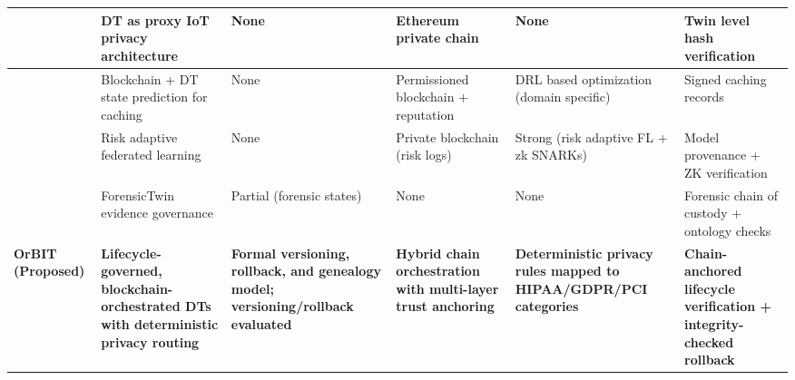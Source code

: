 \documentclass[final,5p,times,twocolumn]{elsarticle}
\begin{document}
\begin{table}[!htbp]
{\begin{tabular}{p{1.3cm}p{4cm}p{3.2cm}p{3.2cm}p{3.5cm}p{3.2cm}}
\cite{samaniego2023digital}      & DT as proxy IoT privacy architecture                                                  & None                                                                & Ethereum private chain                                               & None                                                                          & Twin level hash verification                                               \\ \hline
\cite{du2025blockchain}          & Blockchain + DT state prediction for caching                                          & None                                                                & Permissioned blockchain + reputation                                 & DRL based optimization (domain specific)                                      & Signed caching records                                                     \\ \hline
\cite{swathi2025secure}          & Risk adaptive federated learning                                                      & None                                                                & Private blockchain (risk logs)                                       & Strong (risk adaptive FL + zk SNARKs)                                         & Model provenance + ZK verification                                         \\ \hline
\cite{akremi2025forensictwin}    & ForensicTwin evidence governance                                                      & Partial (forensic states)                                           & None                                                                 & None                                                                          & Forensic chain of custody + ontology checks                                \\ \hline
\textbf{OrBIT (Proposed)} & \textbf{Lifecycle-governed, blockchain-orchestrated DTs with deterministic
privacy routing} & \textbf{Formal versioning, rollback, and genealogy model; versioning/rollback evaluated} & \textbf{Hybrid chain orchestration with multi-layer trust anchoring} & \textbf{Deterministic privacy rules mapped to HIPAA/GDPR/PCI categories} & \textbf{Chain-anchored lifecycle verification + integrity-checked rollback} \\ \hline\toprule
\end{tabular}}
\end{table}
\end{document}
